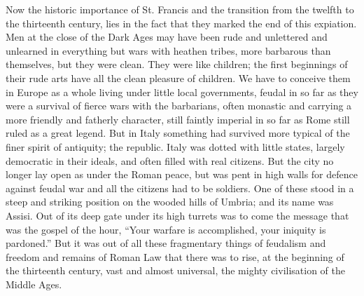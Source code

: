 \documentclass{book}
\begin{document}
Now the historic importance of St. Francis and the transition from the twelfth to the thirteenth century, lies in the fact that they marked the end of this expiation. Men at the close of the Dark Ages may have been rude and unlettered and unlearned in everything but wars with heathen tribes, more barbarous than themselves, but they were clean. They were like children; the first beginnings of their rude arts have all the clean pleasure of children. We have to conceive them in Europe as a whole living under little local governments, feudal in so far as they were a survival of fierce wars with the barbarians, often monastic and carrying a more friendly and fatherly character, still faintly imperial in so far as Rome still ruled as a great legend. But in Italy something had survived more typical of the finer spirit of antiquity; the republic. Italy was dotted with little states, largely democratic in their ideals, and often filled with real citizens. But the city no longer lay open as under the Roman peace, but was pent in high walls for defence against feudal war and all the citizens had to be soldiers. One of these stood in a steep and striking position on the wooded hills of Umbria; and its name was Assisi. Out of its deep gate under its high turrets was to come the message that was the gospel of the hour, “Your warfare is accomplished, your iniquity is pardoned.” But it was out of all these fragmentary things of feudalism and freedom and remains of Roman Law that there was to rise, at the beginning of the thirteenth century, vast and almost universal, the mighty civilisation of the Middle Ages.
\end{document}
